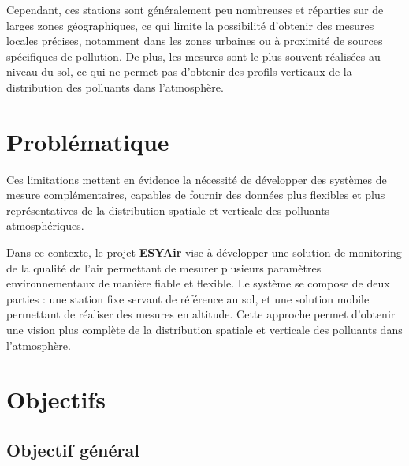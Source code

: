 Cependant, ces stations sont généralement peu nombreuses et réparties sur de larges zones géographiques, ce qui limite la possibilité d'obtenir des mesures locales précises, notamment dans les zones urbaines ou à proximité de sources spécifiques de pollution. De plus, les mesures sont le plus souvent réalisées au niveau du sol, ce qui ne permet pas d'obtenir des profils verticaux de la distribution des polluants dans l'atmosphère.

\section{Problématique}

Ces limitations mettent en évidence la nécessité de développer des systèmes de mesure complémentaires, capables de fournir des données plus flexibles et plus représentatives de la distribution spatiale et verticale des polluants atmosphériques.

Dans ce contexte, le projet \textbf{ESYAir} vise à développer une solution de monitoring de la qualité de l'air permettant de mesurer plusieurs paramètres environnementaux de manière fiable et flexible. Le système se compose de deux parties : une station fixe servant de référence au sol, et une solution mobile permettant de réaliser des mesures en altitude. Cette approche permet d'obtenir une vision plus complète de la distribution spatiale et verticale des polluants dans l'atmosphère.

\section{Objectifs}
\subsection{Objectif général}

